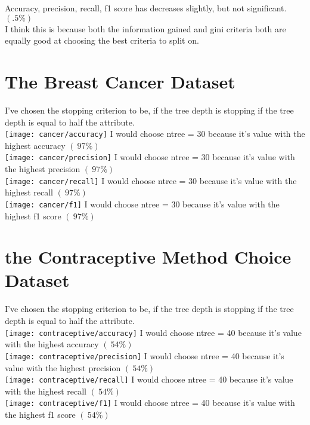 \documentclass[letter]{amsart}
\begin{document}
Accuracy, precision, recall, f1 score has decreases slightly, but not significant. $(.5\%)$\\
I think this is because both the information gained and gini criteria both are equally good at choosing the best criteria to split on.\\

\newpage
\section{The Breast Cancer Dataset}
I've chosen the stopping criterion to be, if the tree depth is stopping if the tree depth is equal to half the attribute.\\
\texttt{[image: cancer/accuracy]}
I would choose ntree = 30 because it's value with the highest accuracy $(~97\%)$\\
\texttt{[image: cancer/precision]}
I would choose ntree = 30 because it's value with the highest precision $(~97\%)$\\
\texttt{[image: cancer/recall]}
I would choose ntree = 30 because it's value with the highest recall $(~97\%)$\\
\texttt{[image: cancer/f1]}
I would choose ntree = 30 because it's value with the highest f1 score $(~97\%)$\\

\newpage
\section{the Contraceptive Method Choice Dataset}
I've chosen the stopping criterion to be, if the tree depth is stopping if the tree depth is equal to half the attribute.\\
\texttt{[image: contraceptive/accuracy]}
I would choose ntree = 40 because it's value with the highest accuracy $(~54\%)$\\
\texttt{[image: contraceptive/precision]}
I would choose ntree = 40 because it's value with the highest precision $(~54\%)$\\
\texttt{[image: contraceptive/recall]}
I would choose ntree = 40 because it's value with the highest recall $(~54\%)$\\
\texttt{[image: contraceptive/f1]}
I would choose ntree = 40 because it's value with the highest f1 score $(~54\%)$\\
\end{document}
